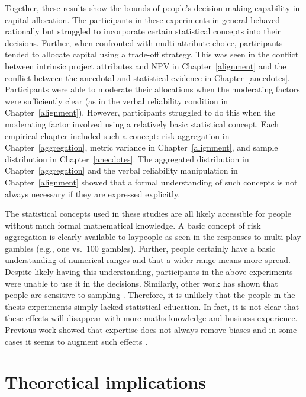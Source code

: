 \documentclass[a4paper, nobind, dvipsnames]{templates/ociamthesis}
\theoremstyle{definition}
\theoremstyle{definition}
\theoremstyle{definition}
\theoremstyle{definition}
\theoremstyle{remark}
\begin{document}
Together, these results show the bounds of people's decision-making capability
in capital allocation. The participants in these experiments in general behaved
rationally but struggled to incorporate certain statistical concepts into their
decisions. Further, when confronted with multi-attribute choice, participants
tended to allocate capital using a trade-off strategy. This was seen in the
conflict between intrinsic project attributes and NPV in
Chapter~\ref{alignment} and the conflict between the anecdotal and statistical
evidence in Chapter~\ref{anecdotes}. Participants were able to moderate their
allocations when the moderating factors were sufficiently clear (as in the
verbal reliability condition in Chapter~\ref{alignment}). However, participants
struggled to do this when the moderating factor involved using a relatively
basic statistical concept. Each empirical chapter included such a concept: risk
aggregation in Chapter~\ref{aggregation}, metric variance in
Chapter~\ref{alignment}, and sample distribution in Chapter~\ref{anecdotes}.
The aggregated distribution in Chapter~\ref{aggregation} and the verbal
reliability manipulation in Chapter~\ref{alignment} showed that a formal
understanding of such concepts is not always necessary if they are expressed
explicitly.

The statistical concepts used in these studies are all likely accessible for
people without much formal mathematical knowledge. A basic concept of risk
aggregation is clearly available to laypeople as seen in the responses to
multi-play gambles (e.g., one vs.~100 gambles). Further, people certainly have a
basic understanding of numerical ranges and that a wider range means more
spread. Despite likely having this understanding, participants in the above
experiments were unable to use it in the decisions. Similarly, other work has
shown that people are sensitive to sampling \autocite{carvalho2021}. Therefore, it is
unlikely that the people in the thesis experiments simply lacked statistical
education. In fact, it is not clear that these effects will disappear with more
maths knowledge and business experience. Previous work showed that expertise
does not always remove biases and in some cases it seems to augment such effects
\autocite[e.g.,][]{haigh2005}.

\hypertarget{theoretical-implications}{%
\section{Theoretical implications}\label{theoretical-implications}}
\end{document}
